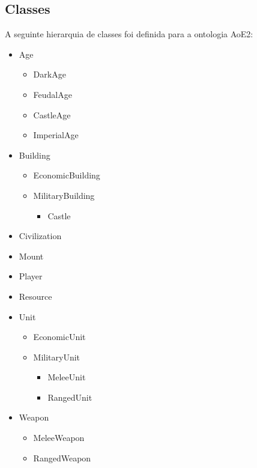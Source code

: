 \documentclass[10pt,a4paper]{article}
\begin{document}
\subsection{Classes}

A seguinte hierarquia de classes foi definida para a ontologia AoE2:
%
\begin{itemize}
    \item Age
        \begin{itemize}
            \item DarkAge
            \item FeudalAge
            \item CastleAge
            \item ImperialAge
        \end{itemize}
    \item Building
        \begin{itemize}
            \item EconomicBuilding
            \item MilitaryBuilding
                \begin{itemize}
                    \item Castle
                \end{itemize}
        \end{itemize}
    \item Civilization
    \item Mount
    \item Player
    \item Resource
    \item Unit
        \begin{itemize}
            \item EconomicUnit
            \item MilitaryUnit
                \begin{itemize}
                    \item MeleeUnit
                    \item RangedUnit
                \end{itemize}
        \end{itemize}
    \item Weapon
        \begin{itemize}
            \item MeleeWeapon
            \item RangedWeapon
        \end{itemize}
\end{itemize}
% 
\end{document}
